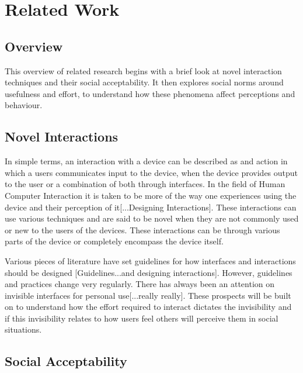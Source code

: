 \documentclass{l4proj}
\begin{document}
\chapter{Related Work}
\section{Overview}

This overview of related research begins with a brief look at novel interaction techniques and their social acceptability. It then explores social norms around usefulness and effort, to understand how these phenomena affect perceptions and behaviour.

\section{Novel Interactions}

In simple terms, an interaction with a device can be described as and action in which a users communicates input to the device, when the device provides output to the user or a combination of both through interfaces. In the field of Human Computer Interaction it is taken to be more of the way one experiences using the device and their perception of it[...Designing Interactions]. These interactions can use various techniques and are said to be novel when they are not commonly used or new to the users of the devices. These interactions can be through various parts of the device or completely encompass the device itself. 

Various pieces of literature have set guidelines for how interfaces and interactions should be designed [Guidelines...and designing interactions]. However, guidelines and practices change very regularly. There has always been an attention on invisible interfaces for personal use[...really really]. These prospects will be built on to understand how the effort required to interact dictates the invisibility and if this invisibility relates to how users feel others will perceive them in social situations.

\section{Social Acceptability}
\end{document}
